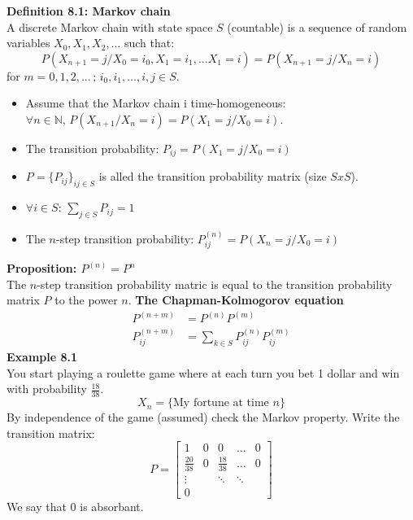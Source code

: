 \documentclass[12pt,a4paper,draft]{report}
\author{Frederik Appel Vardinghus-Nielsen}
\begin{document}
\noindent\textbf{Definition 8.1: Markov chain}\\
A discrete Markov chain with state space $S$ (countable) is a sequence of random variables $X_0,X_1,X_2,\ldots$ such that:
\begin{equation}
P(X_{n+1}=j/X_0=i_0,X_1=i_1,\ldots X_1=i)=P(X_{n+1}=j/X_n=i)\end{equation}
for $m=0,1,2,\ldots\,;\,i_0,i_1,\ldots,i,j\in S.$
\begin{itemize}
\setlength\itemsep{0em}
\item Assume that the Markov chain i time-homogeneous: $\forall n\in\mathbb{N},\,P(X_{n+1}/X_n=i)=P(X_1=j/X_0=i)$.
\item The transition probability: $P_{ij}=P(X_1=j/X_0=i)$
\item $P=\{P_{ij}\}_{ij\in S}$ is alled the transition probability matrix (size $SxS$).
\item $\forall i\in S:\,\sum_{j\in S}P_{ij}=1$
\item The $n$-step transition probability: $P_{ij}^{(n)}=P(X_n=j/X_0=i)$
\end{itemize}
\textbf{Proposition: $P^{(n)}=P^n$}\\
The $n$-step transition probability matric is equal to the transition probability matrix $P$ to the power $n$.
\textbf{The Chapman-Kolmogorov equation}\\
\begin{align*}
P^{(n+m)}&=P^{(n)}P^{(m)}\\
P_{ij}^{(n+m)}&=\sum_{k\in S}P_{ij}^{(n)}P_{ij}^{(m)}
\end{align*}
\textbf{Example 8.1}\\
You start playing a roulette game where at each turn you bet 1 dollar and win with probability $\frac{18}{38}$.
\begin{equation}
X_n=\{\text{My fortune at time }n\}
\end{equation}
By independence of the game (assumed) check the Markov property. Write the transition matrix:
\begin{equation}
P=\begin{bmatrix}
1 & 0 & 0 & \ldots & 0\\
\frac{20}{38} & 0 & \frac{18}{38}& \ldots & 0\\
\vdots & & \ddots & \ddots & \\
0 & & & &
\end{bmatrix}
\end{equation}
We say that 0 is absorbant.\\\\
\end{document}
